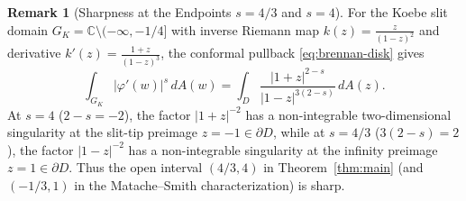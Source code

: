 \documentclass[12pt]{article}
\def\C{\mathbb{C}}
\theoremstyle{definition}
\newtheorem{remark}[thm]{Remark}
\numberwithin{equation}{section}
\begin{document}
\begin{remark}[Sharpness at the Endpoints $s = 4/3$ and $s = 4$]
For the Koebe slit domain $G_K = \C \setminus (-\infty, -1/4]$ with inverse Riemann map $k(z) = \frac{z}{(1-z)^2}$ and derivative $k'(z) = \frac{1+z}{(1-z)^3}$, the conformal pullback \eqref{eq:brennan-disk} gives
\[
  \int_{G_K} |\varphi'(w)|^s \, dA(w) = \int_D \frac{|1+z|^{2-s}}{|1-z|^{3(2-s)}} \, dA(z).
\]
At $s = 4$ ($2 - s = -2$), the factor $|1+z|^{-2}$ has a non-integrable two-dimensional singularity at the slit-tip preimage $z = -1 \in \partial D$, while at $s = 4/3$ ($3(2-s) = 2$), the factor $|1-z|^{-2}$ has a non-integrable singularity at the infinity preimage $z = 1 \in \partial D$. Thus the open interval $(4/3, 4)$ in Theorem~\ref{thm:main} (and $(-1/3, 1)$ in the Matache--Smith characterization) is sharp.
\end{remark}
\end{document}

